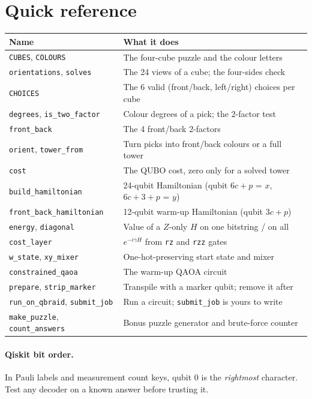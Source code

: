 \documentclass[11pt]{article}
\newcommand{\code}[1]{\texttt{#1}}
\begin{document}
\appendix
\section{Quick reference}

\begin{center}
\begin{tabular}{p{}p{}}
\toprule
Name & What it does \\
\midrule
\code{CUBES}, \code{COLOURS} & The four-cube puzzle and the colour letters \\
\code{orientations}, \code{solves} & The 24 views of a cube; the four-sides check \\
\code{CHOICES} & The 6 valid (front/back, left/right) choices per cube \\
\code{degrees}, \code{is\_two\_factor} & Colour degrees of a pick; the 2-factor test \\
\code{front\_back} & The 4 front/back 2-factors \\
\code{orient}, \code{tower\_from} & Turn picks into front/back colours or a full tower \\
\code{cost} & The QUBO cost, zero only for a solved tower \\
\code{build\_hamiltonian} & 24-qubit Hamiltonian (qubit $6c+p$ = $x$, $6c+3+p$ = $y$) \\
\code{front\_back\_hamiltonian} & 12-qubit warm-up Hamiltonian (qubit $3c+p$) \\
\code{energy}, \code{diagonal} & Value of a $Z$-only $H$ on one bitstring / on all \\
\code{cost\_layer} & $e^{-i\gamma H}$ from \code{rz} and \code{rzz} gates \\
\code{w\_state}, \code{xy\_mixer} & One-hot-preserving start state and mixer \\
\code{constrained\_qaoa} & The warm-up QAOA circuit \\
\code{prepare}, \code{strip\_marker} & Transpile with a marker qubit; remove it after \\
\code{run\_on\_qbraid}, \code{submit\_job} & Run a circuit; \code{submit\_job} is yours to write \\
\code{make\_puzzle}, \code{count\_answers} & Bonus puzzle generator and brute-force counter \\
\bottomrule
\end{tabular}
\end{center}

\paragraph{Qiskit bit order.} In Pauli labels and measurement count keys,
qubit 0 is the \emph{rightmost} character. Test any decoder on a known answer
before trusting it.
\end{document}
